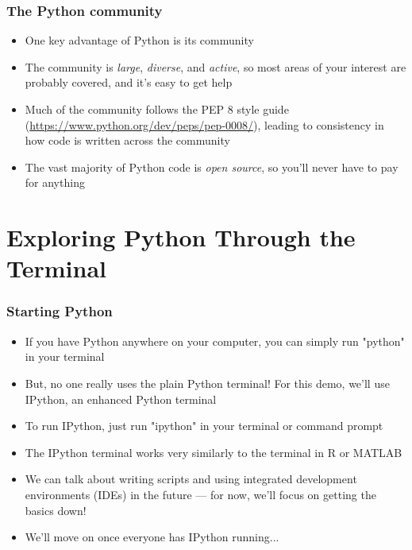 \documentclass{beamer}
\begin{document}
\begin{frame}
\frametitle{The Python community}

\begin{itemize}
	\item One key advantage of Python is its community

	\item The community is \emph{large}, \emph{diverse}, and \emph{active}, so most areas of your interest are probably covered, and it's easy to get help

	\item Much of the community follows the PEP 8 style guide (\url{https://www.python.org/dev/peps/pep-0008/}), leading to consistency in how code is written across the community

	\item The vast majority of Python code is \emph{open source}, so you'll never have to pay for anything
\end{itemize}
\end{frame}

\section{Exploring Python Through the Terminal}

\begin{frame}
\frametitle{Starting Python}

\begin{itemize}
	\item If you have Python anywhere on your computer, you can simply run "python" in your terminal

	\item But, no one really uses the plain Python terminal! For this demo, we'll use IPython, an enhanced Python terminal

	\item To run IPython, just run "ipython" in your terminal or command prompt

	\item The IPython terminal works very similarly to the terminal in R or MATLAB
	
	\item We can talk about writing scripts and using integrated development environments (IDEs) in the future --- for now, we'll focus on getting the basics down!

	\item We'll move on once everyone has IPython running...
\end{itemize}
\end{frame}
\end{document}
